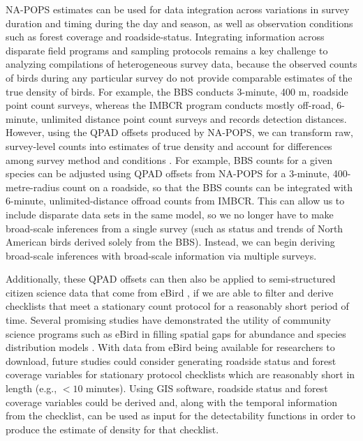 \par NA-POPS estimates can be used for data integration across variations in survey duration and timing during the day and season, as well as observation conditions such as forest coverage and roadside-status.
Integrating information across disparate field programs and sampling protocols remains a key challenge to analyzing compilations of heterogeneous survey data, because the observed counts of birds during any particular survey do not provide comparable estimates of the true density of birds.
For example, the BBS conducts 3-minute, 400 m, roadside point count surveys, whereas the IMBCR program conducts mostly off-road, 6-minute, unlimited distance point count surveys and records detection distances.
However, using the QPAD offsets produced by NA-POPS, we can transform raw, survey-level counts into estimates of true density and account for differences among survey method and conditions \citep{stralberg_projecting_2015, solymos_lessons_2020}.
For example, BBS counts for a given species can be adjusted using QPAD offsets from NA-POPS for a 3-minute, 400-metre-radius count on a roadside, so that the BBS counts can be integrated with 6-minute, unlimited-distance offroad counts from IMBCR.
This can allow us to include disparate data sets in the same model, so we no longer have to make broad-scale inferences from a single survey (such as status and trends of North American birds derived solely from the BBS). Instead, we can begin deriving broad-scale inferences with broad-scale information via multiple surveys. 

\par Additionally, these QPAD offsets can then also be applied to semi-structured citizen science data that come from eBird \citep{sullivan_ebird_2014}, if we are able to filter and derive checklists that meet a stationary count protocol for a reasonably short period of time.
Several promising studies have demonstrated the utility of community science programs such as eBird in filling spatial gaps for abundance and species distribution models \citep{pacifici_integrating_2017, robinson_integrating_2020, joseph_data_2021}.
With data from eBird being available for researchers to download, future studies could consider generating roadside status and forest coverage variables for stationary protocol checklists which are reasonably short in length (e.g., $< 10$ minutes).
Using GIS software, roadside status and forest coverage variables could be derived and, along with the temporal information from the checklist, can be used as input for the detectability functions in order to produce the estimate of density for that checklist. 

